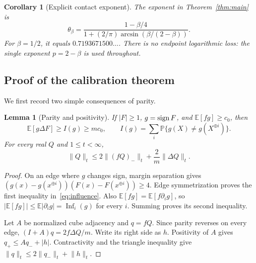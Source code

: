 \documentclass[11pt]{article}
\newtheorem{lemma}[theorem]{Lemma}
\newtheorem{corollary}[theorem]{Corollary}
\theoremstyle{remark}\newtheorem{remark}[theorem]{Remark}
\newcommand{\E}{\mathbb E}\newcommand{\Prb}{\mathbb P}
\newcommand{\1}{\mathbf 1}\newcommand{\norm}[2]{\lVert #1\rVert_{#2}}
\begin{document}
\begin{corollary}[Explicit contact exponent]\label{cor:endpoint}
The exponent in Theorem~\ref{thm:main} is
\begin{equation}\label{eq:endpoint}
 \theta_\beta=\frac{1-\beta/4}
 {1+(2/\pi)\arcsin(\beta/(2-\beta))}.
\end{equation}
For $\beta=1/2$, it equals $0.7193671500\ldots$. There is no endpoint logarithmic loss: the single exponent $p=2-\beta$ is used throughout.
\end{corollary}

\subsection{Proof of the calibration theorem}
We first record two simple consequences of parity.

\begin{lemma}[Parity and positivity]\label{lem:parity}
If $|F|\ge1$, $g=\operatorname{sign} F$, and $\E[fg]\ge c_0$, then
\begin{equation}\label{eq:influence}
 \E[g\Delta F]\ge I(g)\ge mc_0,
 \qquad I(g)=\sum_i\Prb\{g(X)\ne g(X^{\oplus i})\}.
\end{equation}
For every real $Q$ and $1\le t<\infty$,
\begin{equation}\label{eq:positive}
 \norm{Q}{t}\le 2\norm{(fQ)_-}{t}+\frac2m\norm{\Delta Q}{t}.
\end{equation}
\end{lemma}
\begin{proof}
On an edge where $g$ changes sign, margin separation gives
$(g(x)-g(x^{\oplus i}))(F(x)-F(x^{\oplus i}))\ge4$.
Edge symmetrization proves the first inequality in~\eqref{eq:influence}.
Also $\E[fg]=\E[f\partial_i g]$, so
$|\E[fg]|\le\E|\partial_i g|=\operatorname{Inf}_i(g)$ for every $i$.
Summing proves its second inequality.

Let $A$ be normalized cube adjacency and $q=fQ$. Since parity reverses on every edge,
$(I+A)q=2f\Delta Q/m$. Write its right side as $h$. Positivity of $A$ gives
$q_+\le A q_-+|h|$. Contractivity and the triangle inequality give
$\norm{q}{t}\le2\norm{q_-}{t}+\norm{h}{t}$.
\end{proof}
\end{document}
